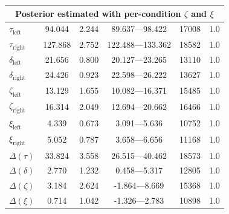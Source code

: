 \documentclass[doc,biblatex]{apa7}
\begin{document}
\begin{table}
\begin{center}
\begin{threeparttable}
\begin{tabular}{lccccc}
\midrule
\multicolumn{6}{c}{Posterior estimated with per-condition $\zeta$ and $\xi$} \\
\midrule
$\tau_\mathrm{left}$  &   94.044 &  2.244 &    89.637---98.422 &   17008 &    1.0 \\
$\tau_\mathrm{right}$ &  127.868 &  2.752 &   122.488---133.362 &   18582 &    1.0 \\
$\delta_\mathrm{left}$  &   21.656 &  0.800 &    20.127---23.265 &   13110 &    1.0 \\
$\delta_\mathrm{right}$ &   24.426 &  0.923 &    22.598---26.222 &   13627 &    1.0 \\
$\zeta_\mathrm{left}$  &   13.129 &  1.655 &    10.082---16.371 &   15485 &    1.0 \\
$\zeta_\mathrm{right}$ &   16.314 &  2.049 &    12.694---20.662 &   16466 &    1.0 \\
$\xi_\mathrm{left}$  &    4.339 &  0.673 &     3.091---5.636 &   10752 &    1.0 \\
$\xi_\mathrm{right}$ &    5.052 &  0.787 &     3.658---6.656 &   11168 &    1.0 \\
$\Delta(\tau)$     &   33.824 &  3.558 &    26.515---40.462 &   18573 &    1.0 \\
$\Delta(\delta)$     &    2.770 &  1.232 &     0.458---5.317 &   12805 &    1.0 \\
$\Delta(\zeta)$    &    3.184 & 2.624  &  -1.864---8.669 &  15368   & 1.0 \\
$\Delta(\xi)$     &   0.714 & 1.042  &  -1.326---2.783  & 10898  &  1.0 \\
\bottomrule
\end{tabular}
\label{supptable2}
\end{threeparttable}
\end{center}
\end{table}

\clearpage
\end{document}
